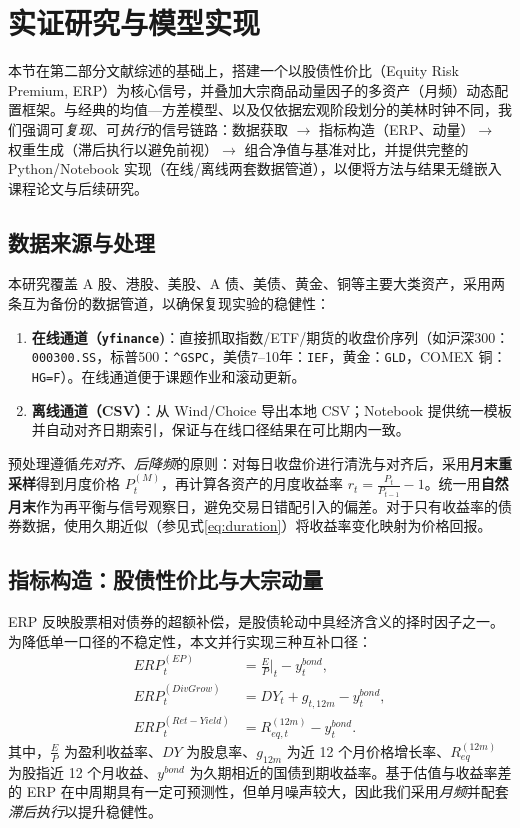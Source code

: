 \documentclass[a4paper,12pt]{article}
\numberwithin{equation}{section}
\begin{document}
\clearpage

\section{实证研究与模型实现} \label{sec:empirical}

本节在第二部分文献综述的基础上，搭建一个以股债性价比（Equity Risk Premium, ERP）为核心信号，并叠加大宗商品动量因子的多资产（月频）动态配置框架。与经典的均值—方差模型\cite{Markowitz1952}、以及仅依据宏观阶段划分的美林时钟不同，我们强调可\emph{复现}、可\emph{执行}的信号链路：数据获取 $\rightarrow$ 指标构造（ERP、动量）$\rightarrow$ 权重生成（滞后执行以避免前视）$\rightarrow$ 组合净值与基准对比，并提供完整的 Python/Notebook 实现（在线/离线两套数据管道），以便将方法与结果无缝嵌入课程论文与后续研究。

\subsection{数据来源与处理} \label{sec:data}
本研究覆盖 A 股、港股、美股、A 债、美债、黄金、铜等主要大类资产，采用两条互为备份的数据管道，以确保复现实验的稳健性：
\begin{enumerate}
  \item \textbf{在线通道（\texttt{yfinance})}：直接抓取指数/ETF/期货的收盘价序列（如沪深300：\texttt{000300.SS}，标普500：\texttt{\^{}GSPC}，美债7--10年：\texttt{IEF}，黄金：\texttt{GLD}，COMEX 铜：\texttt{HG=F}）。在线通道便于课题作业和滚动更新。
  \item \textbf{离线通道（CSV）}：从 Wind/Choice 导出本地 CSV；Notebook 提供统一模板并自动对齐日期索引，保证与在线口径结果在可比期内一致。
\end{enumerate}

预处理遵循\emph{先对齐、后降频}的原则：对每日收盘价进行清洗与对齐后，采用\textbf{月末重采样}得到月度价格 $P_{t}^{(M)}$，再计算各资产的月度收益率 $r_{t}=\frac{P_{t}}{P_{t-1}}-1$。统一用\textbf{自然月末}作为再平衡与信号观察日，避免交易日错配引入的偏差。对于只有收益率的债券数据，使用久期近似（参见式\eqref{eq:duration}）将收益率变化映射为价格回报。

\subsection{指标构造：股债性价比与大宗动量} \label{sec:signals}
ERP 反映股票相对债券的超额补偿，是股债轮动中具经济含义的择时因子之一\cite{FamaFrench1989,FamaFrench1993,Cochrane2011,Ilmanen2011}。为降低单一口径的不稳定性，本文并行实现三种互补口径：
\begin{align}
  ERP^{(EP)}_t &= \frac{E}{P}\Big|_t - y^{bond}_t, \\
  ERP^{(DivGrow)}_t &= DY_t + g_{t,12m} - y^{bond}_t, \\
  ERP^{(Ret-Yield)}_t &= R^{(12m)}_{eq,t} - y^{bond}_t.
\end{align}
其中，$\frac{E}{P}$ 为盈利收益率、$DY$ 为股息率、$g_{12m}$ 为近 12 个月价格增长率、$R^{(12m)}_{eq}$ 为股指近 12 个月收益、$y^{bond}$ 为久期相近的国债到期收益率。基于估值与收益率差的 ERP 在中周期具有一定可预测性，但单月噪声较大，因此我们采用\emph{月频}并配套\emph{滞后执行}以提升稳健性\cite{Cochrane2011,Ilmanen2011}。
\end{document}
